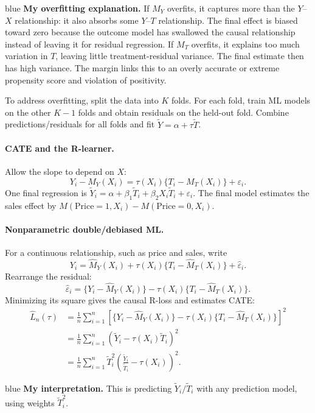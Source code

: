{\begin{inkblock}{blue}
\textbf{My overfitting explanation.} If $M_Y$ overfits, it captures more than the $Y$--$X$ relationship: it also absorbs some $Y$--$T$ relationship. The final effect is biased toward zero because the outcome model has swallowed the causal relationship instead of leaving it for residual regression. If $M_T$ overfits, it explains too much variation in $T$, leaving little treatment-residual variance. The final estimate then has high variance. The margin links this to an overly accurate or extreme propensity score and violation of positivity.
\end{inkblock}

To address overfitting, split the data into $K$ folds. For each fold, train ML models on the other $K-1$ folds and obtain residuals on the held-out fold. Combine predictions/residuals for all folds and fit $\widetilde Y=\alpha+\tau\widetilde T$.

\paragraph{CATE and the R-learner.}
Allow the slope to depend on $X$:
\[Y_i-M_Y(X_i)=\tau(X_i)\{T_i-M_T(X_i)\}+\varepsilon_i.\]
One final regression is $\widetilde Y_i=\alpha+\beta_1\widetilde T_i+\beta_2X_i\widetilde T_i+\varepsilon_i$. The final model estimates the sales effect by $M(\mathrm{Price}=1,X_i)-M(\mathrm{Price}=0,X_i)$. 

\paragraph{Nonparametric double/debiased ML.}
For a continuous relationship, such as price and sales, write
\[Y_i=\hat M_Y(X_i)+\tau(X_i)\{T_i-\hat M_T(X_i)\}+\hat\varepsilon_i.\]
Rearrange the residual:
\[\hat\varepsilon_i=\{Y_i-\hat M_Y(X_i)\}-\tau(X_i)\{T_i-\hat M_T(X_i)\}.\]
Minimizing its square gives the causal R-loss and estimates CATE:
\begin{align*}
\hat L_n(\tau)&=\frac1n\sum_{i=1}^n\left[\{Y_i-\hat M_Y(X_i)\}-\tau(X_i)\{T_i-\hat M_T(X_i)\}\right]^2\\
&=\frac1n\sum_{i=1}^n(\widetilde Y_i-\tau(X_i)\widetilde T_i)^2\\
&=\frac1n\sum_{i=1}^n\widetilde T_i^2\left(\frac{\widetilde Y_i}{\widetilde T_i}-\tau(X_i)\right)^2.
\end{align*}
\begin{inkblock}{blue}
\textbf{My interpretation.} This is predicting $\widetilde Y_i/\widetilde T_i$ with any prediction model, using weights $\widetilde T_i^2$.
\end{inkblock}

}
